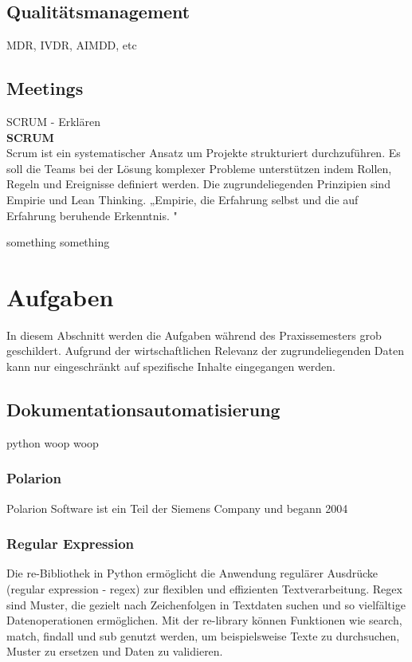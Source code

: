 \documentclass[a4paper, 12pt]{article}
\begin{document}
\newpage
\subsection{Qualitätsmanagement}\label{Qualitätsmanagement}
MDR, IVDR, AIMDD, etc

\subsection{Meetings}\label{Meetings}
SCRUM - Erklären
\\ 
\textbf{SCRUM}\\
Scrum ist ein systematischer Ansatz um Projekte strukturiert durchzuführen. Es soll die Teams bei der Lösung komplexer Probleme unterstützen indem Rollen, Regeln und Ereignisse definiert werden. Die zugrundeliegenden Prinzipien sind Empirie und Lean Thinking. 
„Empirie, die Erfahrung selbst und die auf Erfahrung beruhende Erkenntnis.  
 \cite{dorsch_empirie}" 

something something 
\cite{scrum2020}

\newpage
\section{Aufgaben}\label{Aufgaben}
In diesem Abschnitt werden die Aufgaben während des Praxissemesters grob geschildert. Aufgrund der wirtschaftlichen Relevanz der zugrundeliegenden Daten kann nur eingeschränkt auf spezifische Inhalte eingegangen werden.

\subsection{Dokumentationsautomatisierung}\label{Dokumentationsautomatisierung}
python woop woop

\subsubsection{Polarion}\label{polarion}
Polarion Software ist ein Teil der Siemens Company und begann 2004

\subsubsection{Regular Expression}\label{regularExpression}
Die re-Bibliothek in Python ermöglicht die Anwendung regulärer Ausdrücke (regular expression - regex) zur flexiblen und effizienten Textverarbeitung. Regex sind Muster, die gezielt nach Zeichenfolgen in Textdaten suchen und so vielfältige Datenoperationen ermöglichen. Mit der re-library können Funktionen wie search, match, findall und sub genutzt werden, um beispielsweise Texte zu durchsuchen, Muster zu ersetzen und Daten zu validieren.
\end{document}
